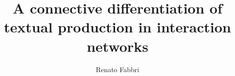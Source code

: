 \documentclass[%
 aip,
 jmp,%
 amsmath,amssymb,
 reprint,%
]{revtex4-1}
\begin{document}

\title[Textual differentiation in interaction networks]{A connective differentiation of textual production in interaction networks}%

\author{Renato Fabbri}%
%
%
%

%
%
%
%
%
\end{document}
